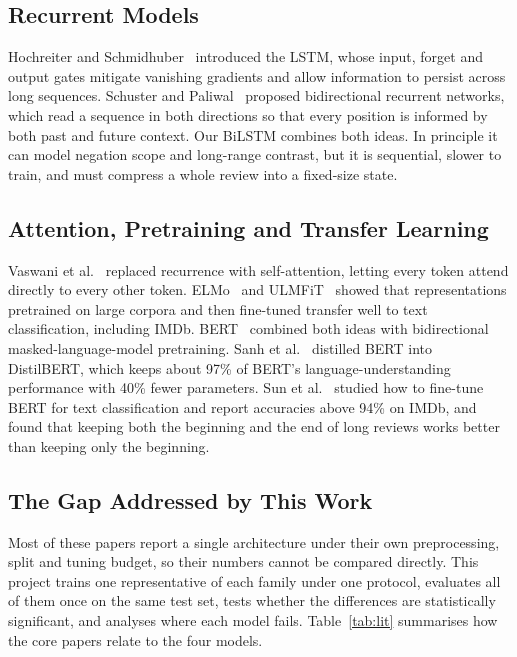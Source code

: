\documentclass[conference,onecolumn,a4paper,10pt]{IEEEtran}
\begin{document}
\subsection{Recurrent Models}
Hochreiter and Schmidhuber~\cite{hochreiter1997} introduced the LSTM, whose input, forget and output gates mitigate vanishing gradients and allow information to persist across long sequences. Schuster and Paliwal~\cite{schuster1997} proposed bidirectional recurrent networks, which read a sequence in both directions so that every position is informed by both past and future context. Our BiLSTM combines both ideas. In principle it can model negation scope and long-range contrast, but it is sequential, slower to train, and must compress a whole review into a fixed-size state.

\subsection{Attention, Pretraining and Transfer Learning}
Vaswani et al.~\cite{vaswani2017} replaced recurrence with self-attention, letting every token attend directly to every other token. ELMo~\cite{peters2018} and ULMFiT~\cite{howard2018} showed that representations pretrained on large corpora and then fine-tuned transfer well to text classification, including IMDb. BERT~\cite{devlin2019} combined both ideas with bidirectional masked-language-model pretraining. Sanh et al.~\cite{sanh2019} distilled BERT into DistilBERT, which keeps about 97\% of BERT's language-understanding performance with 40\% fewer parameters. Sun et al.~\cite{sun2019} studied how to fine-tune BERT for text classification and report accuracies above 94\% on IMDb, and found that keeping both the beginning and the end of long reviews works better than keeping only the beginning.

\subsection{The Gap Addressed by This Work}
Most of these papers report a single architecture under their own preprocessing, split and tuning budget, so their numbers cannot be compared directly. This project trains one representative of each family under one protocol, evaluates all of them once on the same test set, tests whether the differences are statistically significant, and analyses where each model fails. Table~\ref{tab:lit} summarises how the core papers relate to the four models.
\end{document}

